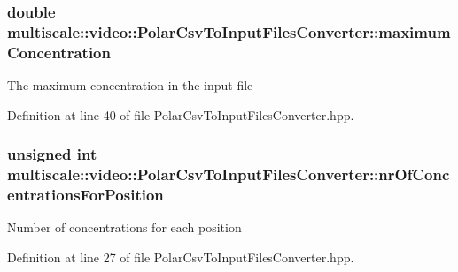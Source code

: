 \hypertarget{classmultiscale_1_1video_1_1PolarCsvToInputFilesConverter_a89b7dce2825cd5c8c45a1e6f19770e5f}{
\subsubsection[{maximum\-Concentration}]{\setlength{\rightskip}{0pt plus 5cm}double {\bf multiscale\-::video\-::\-Polar\-Csv\-To\-Input\-Files\-Converter\-::maximum\-Concentration}}}\label{classmultiscale_1_1video_1_1PolarCsvToInputFilesConverter_a89b7dce2825cd5c8c45a1e6f19770e5f}
\-The maximum concentration in the input file 

\-Definition at line 40 of file \-Polar\-Csv\-To\-Input\-Files\-Converter.\-hpp.

\hypertarget{classmultiscale_1_1video_1_1PolarCsvToInputFilesConverter_a3a9301788514c50c295ca113a4114938}{
\subsubsection[{nr\-Of\-Concentrations\-For\-Position}]{\setlength{\rightskip}{0pt plus 5cm}unsigned int {\bf multiscale\-::video\-::\-Polar\-Csv\-To\-Input\-Files\-Converter\-::nr\-Of\-Concentrations\-For\-Position}}}\label{classmultiscale_1_1video_1_1PolarCsvToInputFilesConverter_a3a9301788514c50c295ca113a4114938}
\-Number of concentrations for each position 

\-Definition at line 27 of file \-Polar\-Csv\-To\-Input\-Files\-Converter.\-hpp.

